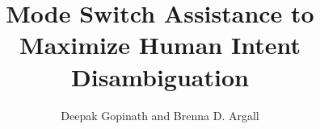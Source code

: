 \documentclass[conference]{IEEEtran}
\begin{document}
\title{Mode Switch Assistance to\\Maximize Human Intent Disambiguation}
\author{Deepak Gopinath and Brenna D. Argall}




% 
%
%
%
%


\maketitle
\end{document}
